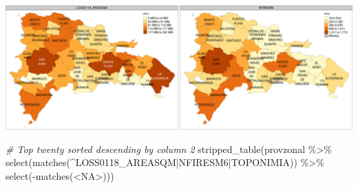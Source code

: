 \documentclass[10pt,landscape,a3paper]{article}
\newenvironment{Shaded}{\begin{snugshade}}{\end{snugshade}}
\newcommand{\CommentTok}[1]{\textcolor[rgb]{0.56,0.35,0.01}{\textit{#1}}}
\newcommand{\FunctionTok}[1]{\textcolor[rgb]{0.00,0.00,0.00}{#1}}
\newcommand{\NormalTok}[1]{#1}
\newcommand{\SpecialCharTok}[1]{\textcolor[rgb]{0.00,0.00,0.00}{#1}}
\newcommand{\StringTok}[1]{\textcolor[rgb]{0.31,0.60,0.02}{#1}}
\begin{document}
\begin{center}\includegraphics{img/zonal-prov-7} \end{center}

\begin{Shaded}
\begin{Highlighting}[]
\CommentTok{\# Top twenty sorted descending by column 2}
\FunctionTok{stripped\_table}\NormalTok{(provzonal }\SpecialCharTok{\%\textgreater{}\%} \FunctionTok{select}\NormalTok{(}\FunctionTok{matches}\NormalTok{(}\StringTok{\textquotesingle{}\^{}LOSS0118\_AREASQM|NFIRESM6|TOPONIMIA\textquotesingle{}}\NormalTok{)) }\SpecialCharTok{\%\textgreater{}\%} \FunctionTok{select}\NormalTok{(}\SpecialCharTok{{-}}\FunctionTok{matches}\NormalTok{(}\StringTok{\textquotesingle{}\textless{}NA\textgreater{}\textquotesingle{}}\NormalTok{)))}
\end{Highlighting}
\end{Shaded}
\end{document}
